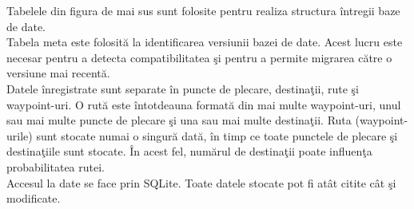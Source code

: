 Tabelele din figura de mai sus sunt folosite pentru realiza structura întregii baze de date.
\vspace{6pt}
\\Tabela meta este folosită la identificarea versiunii bazei de date. Acest lucru este necesar pentru a detecta compatibilitatea şi pentru a permite migrarea către o versiune mai recentă. 
\vspace{6pt}
\\Datele înregistrate sunt separate în puncte de plecare, destinaţii, rute şi waypoint-uri. O rută este întotdeauna formată din mai multe waypoint-uri, unul sau mai multe puncte de plecare şi una sau mai multe destinaţii. Ruta (waypoint-urile) sunt stocate numai o singură dată, în timp ce toate punctele de plecare şi destinaţiile sunt stocate. În acest fel, numărul de destinaţii poate influenţa probabilitatea rutei.
\vspace{6pt}
\\Accesul la date se face prin SQLite. Toate datele stocate pot fi atât citite cât şi modificate.


